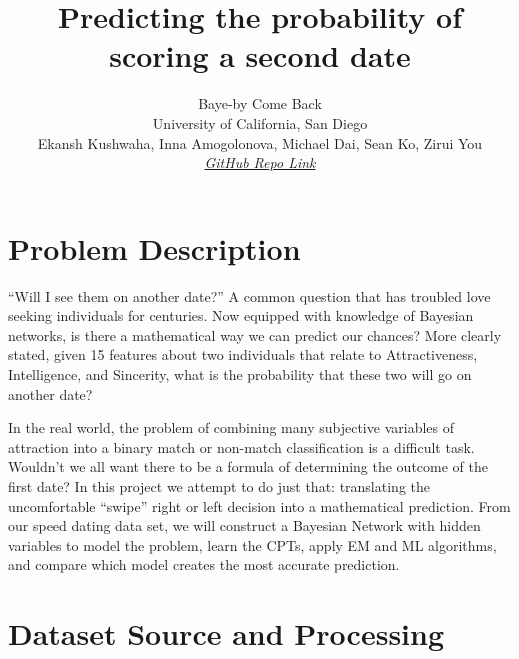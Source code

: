 \documentclass{article}
\title{Predicting the probability of scoring a second date }
\author{%
  Baye-by Come Back\\
  University of California, San Diego\\
  Ekansh Kushwaha, Inna Amogolonova, Michael Dai, Sean Ko, Zirui You\\
  \href{https://github.com/innaamogolonova/cse250a_final_project}{\textit{GitHub Repo Link}} \\
}
\begin{document}
\maketitle




\section{Problem Description}
“Will I see them on another date?” A common question that has troubled love seeking individuals for centuries. Now equipped with knowledge of Bayesian networks, is there a mathematical way we can predict our chances? More clearly stated, given 15 features about two individuals that relate to {Attractiveness, Intelligence, and Sincerity}, what is the probability that these two will go on another date? 

In the real world, the problem of combining many subjective variables of attraction into a binary match or non-match classification is a difficult task. Wouldn’t we all want there to be a formula of determining the outcome of the first date? In this project we attempt to do just that: translating the uncomfortable “swipe” right or left decision into a mathematical prediction. From our speed dating data set, we will construct a Bayesian Network with hidden variables to model the problem, learn the CPTs, apply EM and ML algorithms, and compare which model creates the most accurate prediction. \\


\section{Dataset Source and Processing}
\end{document}
